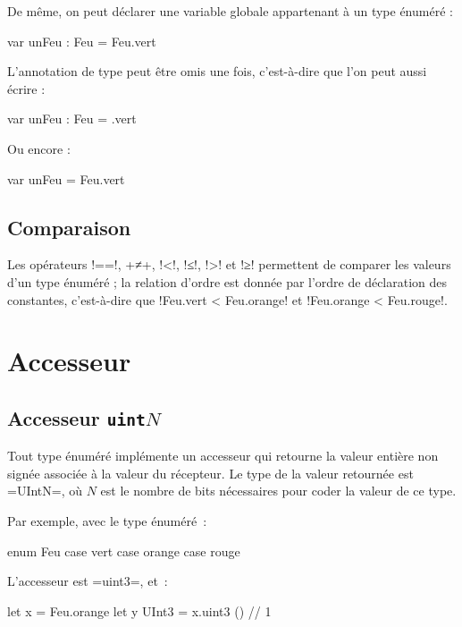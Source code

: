 De même, on peut déclarer une variable globale appartenant à un type énuméré :
\begin{OMNIBUS}
var unFeu : Feu = Feu.vert
\end{OMNIBUS}

L'annotation de type peut être omis une fois, c'est-à-dire que l'on peut aussi écrire :
\begin{OMNIBUS}
var unFeu : Feu = .vert
\end{OMNIBUS}

Ou encore :
\begin{OMNIBUS}
var unFeu = Feu.vert
\end{OMNIBUS}

\subsection{Comparaison}

Les opérateurs \omnibus!==!, \omnibus+≠+, \omnibus!<!, \omnibus!≤!, \omnibus!>! et \omnibus!≥! permettent de comparer les valeurs d'un type énuméré ; la relation d'ordre est donnée par l'ordre de déclaration des constantes, c'est-à-dire que \omnibus!Feu.vert < Feu.orange! et \omnibus!Feu.orange < Feu.rouge!.







\section{Accesseur}

\subsection{Accesseur \texttt{uint$N$}}

Tout type énuméré implémente un accesseur qui retourne la valeur entière non signée associée à la valeur du récepteur. Le type de la valeur retournée est \omnibus=UIntN=, où $N$ est le nombre de bits nécessaires pour coder la valeur de ce type.

Par exemple, avec le type énuméré~:
\begin{OMNIBUS}
enum Feu {
  case vert
  case orange
  case rouge
}
\end{OMNIBUS}

L'accesseur est \omnibus=uint3=, et~:
\begin{OMNIBUS}
let x = Feu.orange
let y UInt3 = x.uint3 () // 1
\end{OMNIBUS}








